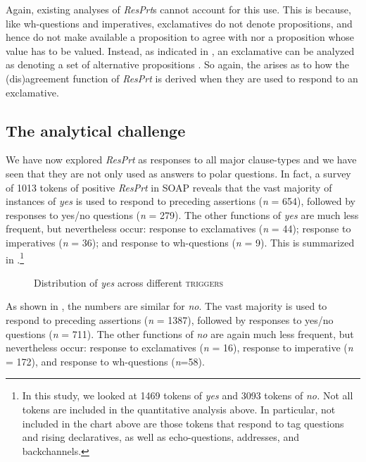\documentclass[output=paper]{LSP/langsci}
\begin{document}
Again, existing analyses of \textit{ResPrt}s cannot account for this use.
This is because, like wh-questions and imperatives, exclamatives do not denote propositions, and hence do not make available a proposition to agree with nor a proposition whose  value has to be valued.
Instead, as indicated in , an exclamative can be analyzed as denoting a set of alternative propositions \citep{ZanuttiniPortner2003}. So again, the  arises as to how the (dis)agreement function of \textit{ResPrt} is derived when they are used to respond to an exclamative.


\subsection{The analytical challenge} 
We have now explored \textit{ResPrt} as responses to all major clause-types and we have seen that they are not only used as answers to polar questions. \textsc{I}n fact, a survey of 1013 tokens of positive \textit{ResPrt} in SOAP reveals that the vast majority of instances of \textit{yes} is used to respond to preceding assertions (\textit{n} = 654), followed by responses to yes/no questions (\textit{n} = 279). The other functions of \textit{yes} are much less frequent, but nevertheless occur: response to exclamatives (\textit{n} = 44); response to imperatives (\textit{n} = 36); and response to wh-questions (\textit{n} = 9). This is summarized in .\footnote{In this study, we looked at 1469 tokens of \textit{yes} and 3093 tokens of \textit{no.}  Not all tokens are included in the quantitative analysis above.
In particular, not included in the chart above are those tokens that respond to tag questions and rising declaratives, as well as echo-questions, addresses, and backchannels.}  

\begin{figure}
\caption{Distribution of \textit{yes} across different \textsc{triggers}}
\label{fig:wiltschko:yes}
  \label{fig:barplot}
\end{figure}

As shown in , the numbers are similar for \textit{no}. The vast majority is used to respond to preceding assertions (\textit{n} = 1387), followed by responses to yes/no questions (\textit{n} = 711). The other functions of \textit{no} are again much less frequent, but nevertheless occur: response to exclamatives (\textit{n} = 16), response to imperative (\textit{n} = 172), and response to wh-questions (\textit{n}=58).
\end{document}
